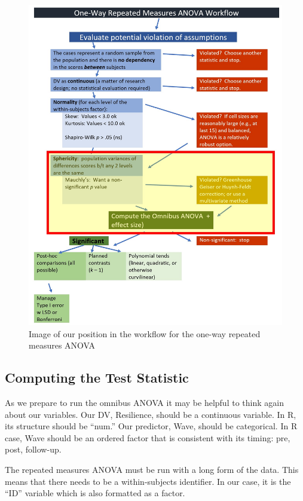 \documentclass[
  11pt,
]{book}
\begin{document}
\begin{figure}
\centering
\includegraphics{images/oneway_repeated/wf_rptd_omnibus.jpg}
\caption{Image of our position in the workflow for the one-way repeated measures ANOVA}
\end{figure}

\hypertarget{computing-the-test-statistic}{%
\subsection{Computing the Test Statistic}\label{computing-the-test-statistic}}

As we prepare to run the omnibus ANOVA it may be helpful to think again about our variables. Our DV, Resilience, should be a continuous variable. In R, its structure should be ``num.'' Our predictor, Wave, should be categorical. In R case, Wave should be an ordered factor that is consistent with its timing: pre, post, follow-up.

The repeated measures ANOVA must be run with a long form of the data. This means that there needs to be a within-subjects identifier. In our case, it is the ``ID'' variable which is also formatted as a factor.
\end{document}
